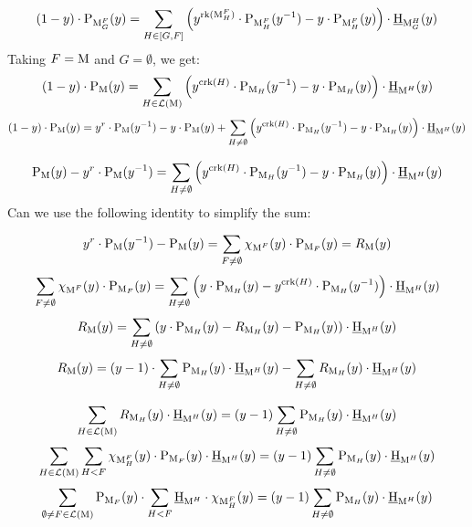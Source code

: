 \documentclass[11pt]{article}
\newcommand{\calL}{\mathcal{L}}
\newcommand{\chow}{\normalfont\text{\underline{H}}}
\newcommand{\klpoly}{\normalfont\text{P}}
\newcommand{\rank}{\normalfont\text{rk}}
\newcommand{\corank}{\normalfont\text{crk}}
\newcommand{\M}{\normalfont\text{M}}
\theoremstyle{remark}
\begin{document}
\[(1-y)\cdot\klpoly_{\M_G^F}(y) =
\sum_{H\in [G,F]} \left(y^{\rank(\M_H^F)}\cdot\klpoly_{\M_H^F}(y^{-1})
-y\cdot\klpoly_{\M_H^F}(y)\right)\cdot \chow_{\M_G^H}(y)\]
Taking \(F = \M\) and \(G = \emptyset\), we get:
\[(1-y)\cdot\klpoly_{\M}(y) =
\sum_{H\in \calL(\M)} \left(y^{\corank(H)}\cdot\klpoly_{\M_H}(y^{-1})
-y\cdot\klpoly_{\M_H}(y)\right)\cdot \chow_{\M^H}(y)\]
\[(1-y)\cdot\klpoly_{\M}(y) = y^r\cdot\klpoly_{\M}(y^{-1}) - y\cdot\klpoly_{\M}(y)+
\sum_{H\neq \emptyset} \left(y^{\corank(H)}\cdot\klpoly_{\M_H}(y^{-1})
-y\cdot\klpoly_{\M_H}(y)\right)\cdot \chow_{\M^H}(y)\]

\[\klpoly_{\M}(y)-y^r\cdot\klpoly_{\M}(y^{-1}) =
\sum_{H\neq \emptyset} \left(y^{\corank(H)}\cdot\klpoly_{\M_H}(y^{-1})
-y\cdot\klpoly_{\M_H}(y)\right)\cdot \chow_{\M^H}(y)\]
Can we use the following identity to simplify the sum:

\[ y^{r}\cdot \klpoly_{\M}(y^{-1}) - \klpoly_{\M}(y) =
\sum_{F\neq \emptyset} \chi_{\M^F}(y)\cdot
\klpoly_{\M_F}(y) = R_{\M}(y)\] 
\[ \sum_{F\neq \emptyset} \chi_{\M^F}(y)\cdot \klpoly_{\M_F}(y) = \sum_{H\neq \emptyset} \left(y\cdot\klpoly_{\M_H}(y) - y^{\corank(H)}\cdot\klpoly_{\M_H}(y^{-1})\right)\cdot \chow_{\M^H}(y)\]
\[ R_{\M}(y) =
\sum_{H\neq \emptyset} \left(y\cdot\klpoly_{\M_H}(y)
- R_{\M_H}(y) - \klpoly_{\M_H}(y)\right)\cdot \chow_{\M^H}(y)\]
\[ R_{\M}(y) =
(y-1)\cdot\sum_{H\neq \emptyset} \klpoly_{\M_H}(y)\cdot \chow_{\M^H}(y)
- \sum_{H\neq \emptyset} R_{\M_H}(y)\cdot \chow_{\M^H}(y)\]

\[\sum_{H\in \calL(\M)} R_{\M_H}(y)\cdot \chow_{\M^H}(y) = (y-1)\sum_{H\neq \emptyset} \klpoly_{\M_H}(y)\cdot \chow_{\M^H}(y)\]
\[\sum_{H\in \calL(\M)} \sum_{H < F}
\chi_{\M^F_H}(y)\cdot\klpoly_{\M_F}(y)\cdot \chow_{\M^H}(y) = (y-1)\sum_{H\neq \emptyset} \klpoly_{\M_H}(y)\cdot \chow_{\M^H}(y)\]
\[\sum_{\emptyset \neq F\in \calL(\M)}\klpoly_{\M_F}(y)\cdot
\sum_{H < F}
\chow_{\M^H}\cdot\chi_{\M_H^F}(y) = (y-1)\sum_{H\neq \emptyset} \klpoly_{\M_H}(y)\cdot \chow_{\M^H}(y)\]
\end{document}
